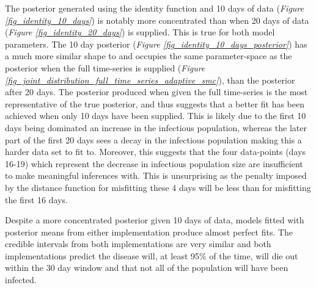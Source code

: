\documentclass[11pt,a4paper]{article}
\theoremstyle{break}
\begin{document}
  \par The posterior generated using the identity function and 10 days of data (\textit{Figure \ref{fig_identity_10_days}}) is notably more concentrated than when 20 days of data (\textit{Figure \ref{fig_identity_20_days}}) is supplied. This is true for both model parameters. The 10 day posterior (\textit{Figure \ref{fig_identity_10_days_posterior}}) has a much more similar shape to and occupies the same parameter-space as the posterior when the full time-series is supplied (\textit{Figure \ref{fig_joint_distribution_full_time_series_adaptive_smc}}), than the posterior after 20 days. The posterior produced when given the full time-series is the most representative of the true posterior, and thus suggests that a better fit has been achieved when only 10 days have been supplied. This is likely due to the first 10 days being dominated an increase in the infectious population, whereas the later part of the first 20 days sees a decay in the infectious population making this a harder data set to fit to. Moreover, this suggests that the four data-points (days 16-19) which represent the decrease in infectious population size are insufficient to make meaningful inferences with. This is unsurprising as the penalty imposed by the distance function for misfitting these 4 days will be less than for misfitting the first 16 days.

  \par Despite a more concentrated posterior given 10 days of data, models fitted with posterior means from either implementation produce almost perfect fits. The credible intervals from both implementations are very similar and both implementations predict the disease will, at least 95\% of the time, will die out within the 30 day window and that not all of the population will have been infected.
\end{document}
